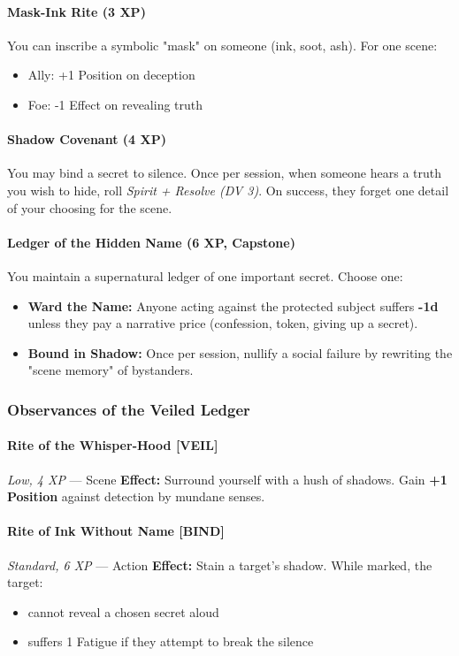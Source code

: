 \documentclass[11pt]{book}
\begin{document}
\paragraph{Mask-Ink Rite (3 XP)}
You can inscribe a symbolic "mask" on someone (ink, soot, ash).  
For one scene:
\begin{itemize}[leftmargin=*]
    \item Ally: +1 Position on deception  
    \item Foe: -1 Effect on revealing truth  
\end{itemize}

\paragraph{Shadow Covenant (4 XP)}
You may bind a secret to silence.  
Once per session, when someone hears a truth you wish to hide, roll \emph{Spirit + Resolve (DV 3)}.  
On success, they forget one detail of your choosing for the scene.

\paragraph{Ledger of the Hidden Name (6 XP, Capstone)}
You maintain a supernatural ledger of one important secret.
Choose one:
\begin{itemize}[leftmargin=*]
    \item \textbf{Ward the Name:} Anyone acting against the protected subject suffers \textbf{-1d} unless they pay a narrative price (confession, token, giving up a secret).
    \item \textbf{Bound in Shadow:} Once per session, nullify a social failure by rewriting the "scene memory" of bystanders.
\end{itemize}

\subsubsection{Observances of the Veiled Ledger}

\paragraph{Rite of the Whisper-Hood [VEIL]}
\emph{Low, 4 XP} --- Scene  
\textbf{Effect:} Surround yourself with a hush of shadows.  
Gain \textbf{+1 Position} against detection by mundane senses.

\paragraph{Rite of Ink Without Name [BIND]}
\emph{Standard, 6 XP} --- Action  
\textbf{Effect:} Stain a target's shadow.  
While marked, the target:
\begin{itemize}[leftmargin=*]
    \item cannot reveal a chosen secret aloud  
    \item suffers 1 Fatigue if they attempt to break the silence  
\end{itemize}
\end{document}
